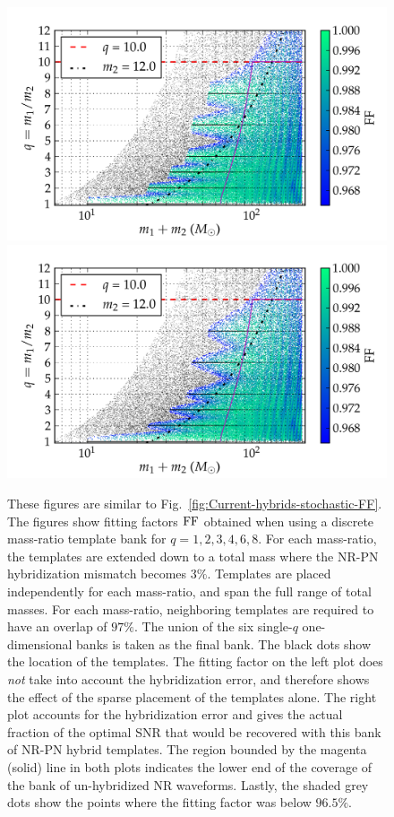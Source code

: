\begin{figure}
\begin{center}
\includegraphics[width=\columnwidth]{bank_26022013_02_mtot200_logMq_NOhybMM.png}
\includegraphics[width=\columnwidth]{bank_26022013_02_mtot200_logMq_hybMM.png}
\caption{\label{fig:Current-hybrids-FF}These figures are similar to 
  Fig.~\ref{fig:Current-hybrids-stochastic-FF}. The figures show fitting
  factors $\mathrm{FF}$ obtained when using a discrete mass-ratio template bank for
  $q=1,2,3,4,6,8$. For each mass-ratio, the templates are extended down 
  to a total mass where the NR-PN hybridization mismatch becomes
  $3\%$. Templates are placed independently for each mass-ratio, and span the 
  full range of total masses. For each mass-ratio, neighboring templates are 
  required to have an overlap of $97\%$. The union of the six single-$q$ 
  one-dimensional banks is taken as the final bank. The black dots show the 
  location of the templates. The fitting factor on the left plot does 
  {\em not} take into account the hybridization error, and therefore shows the
  effect of the sparse placement of the templates alone. The right plot accounts
  for the hybridization error
  and gives the actual fraction of the optimal SNR that would be recovered
  with this bank of NR-PN hybrid templates. The region bounded by the magenta 
  (solid) line in both plots indicates the lower end of the coverage of the 
  bank of un-hybridized NR waveforms. Lastly, the shaded grey dots show the 
  points where the fitting factor was below $96.5\%$.}
\end{center}
\end{figure}

